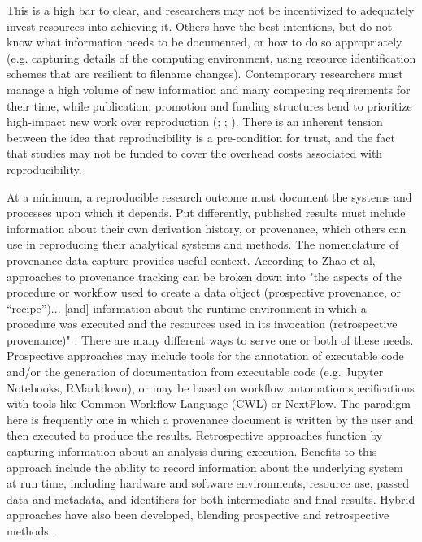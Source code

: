 \noindent This is a high bar to clear, and researchers may not be incentivized to
adequately invest resources into achieving it. Others have the best intentions,
but do not know what information needs to be documented, or how to do so
appropriately (e.g. capturing details of the computing environment, using
resource identification schemes that are resilient to filename changes).
Contemporary researchers must manage a high volume of new information and many
competing requirements for their time, while publication, promotion and funding
structures tend to prioritize high-impact new work over reproduction
(\cite{community_turing_2021}; \cite{shiffrin_scientific_2018}; \cite{munafo_manifesto_2017}).
There is an inherent tension between the idea that reproducibility is a
pre-condition for trust, and the fact that studies may not be funded to cover
the overhead costs associated with reproducibility.

At a minimum, a reproducible research outcome must document the systems and
processes upon which it depends. Put differently, published results must include
information about their own derivation history, or provenance, which others can
use in reproducing their analytical systems and methods. The nomenclature of
provenance data capture provides useful context. According to Zhao et al,
approaches to provenance tracking can be broken down into "the aspects of the
procedure or workflow used to create a data object (prospective provenance, or
“recipe”)... [and] information about the runtime environment in which a
procedure was executed and the resources used in its invocation (retrospective
provenance)" \parencite[149]{hutchison_applying_2006}. There are many different ways
to serve one or both of these needs. Prospective approaches may include tools
for the annotation of executable code and/or the generation of documentation
from executable code (e.g. Jupyter Notebooks, RMarkdown), or may be based on
workflow automation specifications with tools like Common Workflow Language
(CWL) or NextFlow. The paradigm here is frequently one in which a provenance
document is written by the user and then executed to produce the results.
Retrospective approaches function by capturing information about an analysis
during execution. Benefits to this approach include the ability to record
information about the underlying system at run time, including hardware and
software environments, resource use, passed data and metadata, and identifiers
for both intermediate and final results. Hybrid approaches have also been
developed, blending prospective and retrospective methods \parencite{zhang_revealing_2017}.


